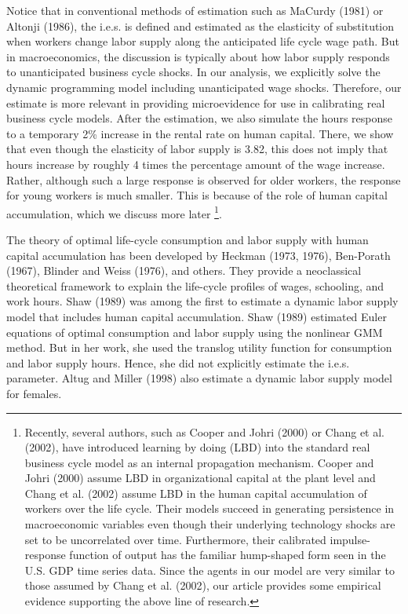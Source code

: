 \documentclass{article}
\begin{document}
Notice that in conventional methods of estimation such as MaCurdy (1981) or Altonji (1986), the i.e.s. is defined and estimated as the elasticity of substitution when workers change labor supply along the anticipated life cycle wage path. But in macroeconomics, the discussion is typically about how labor supply responds to unanticipated business cycle shocks. In our analysis, we explicitly solve the dynamic programming model including unanticipated wage shocks. Therefore, our estimate is more relevant in providing microevidence for use in calibrating real business cycle models. After the estimation, we also simulate the hours response to a temporary 2\% increase in the rental rate on human capital. There, we show that even though the elasticity of labor supply is 3.82, this does not imply that hours increase by roughly 4 times the percentage amount of the wage increase. Rather, although such a large response is observed for older workers, the response for young workers is much smaller. This is because of the role of human capital accumulation, which we discuss more later \footnote[3]{Recently, several authors, such as Cooper and Johri (2000) or Chang et al. (2002), have introduced learning by doing (LBD) into the standard real business cycle model as an internal propagation mechanism. Cooper and Johri (2000) assume LBD in organizational capital at the plant level and Chang et al. (2002) assume LBD in the human capital accumulation of workers over the life cycle. Their models succeed in generating persistence in macroeconomic variables even though their underlying technology shocks are set to be uncorrelated over time. Furthermore, their calibrated impulse-response function of output has the familiar hump-shaped form seen in the U.S. GDP time series data. Since the agents in our model are very similar to those assumed by Chang et al. (2002), our article provides some empirical evidence supporting the above line of research.}. \par
The theory of optimal life-cycle consumption and labor supply with human capital accumulation has been developed by Heckman (1973, 1976), Ben-Porath (1967), Blinder and Weiss (1976), and others. They provide a neoclassical theoretical framework to explain the life-cycle profiles of wages, schooling, and work hours. Shaw (1989) was among the first to estimate a dynamic labor supply model that includes human capital accumulation. Shaw (1989) estimated Euler equations of optimal consumption and labor supply using the nonlinear GMM method. But in her work, she used the translog utility function for consumption and labor supply hours. Hence, she did not explicitly estimate the i.e.s. parameter. Altug and Miller (1998) also estimate a dynamic labor supply model for females. \par
\end{document}
